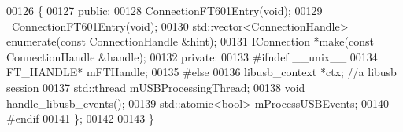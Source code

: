 \begin{DoxyCode}
00126 \{
00127 \textcolor{keyword}{public}:
00128     ConnectionFT601Entry(\textcolor{keywordtype}{void});
00129     ~ConnectionFT601Entry(\textcolor{keywordtype}{void});
00130     std::vector<ConnectionHandle> enumerate(\textcolor{keyword}{const} ConnectionHandle &hint);
00131     IConnection *make(\textcolor{keyword}{const} ConnectionHandle &handle);
00132 \textcolor{keyword}{private}:
00133 \textcolor{preprocessor}{#ifndef \_\_unix\_\_}
00134     FT_HANDLE* mFTHandle;
00135 \textcolor{preprocessor}{#else}
00136     libusb\_context *ctx; \textcolor{comment}{//a libusb session}
00137     std::thread mUSBProcessingThread;
00138     \textcolor{keywordtype}{void} handle\_libusb\_events();
00139     std::atomic<bool> mProcessUSBEvents;
00140 \textcolor{preprocessor}{#endif}
00141 \};
00142 
00143 \}
\end{DoxyCode}
